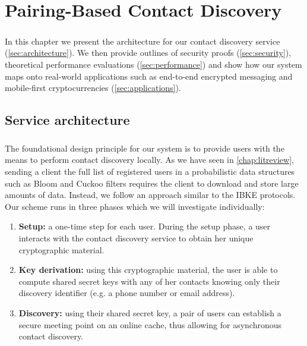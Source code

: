 \chapter{Pairing-Based Contact Discovery}
\label{chap:system}

\newcommand{\msk}{\mathbf{msk}}
\newcommand{\mpk}{\mathbf{mpk}}
\newcommand{\keyleft}[1]{k_{#1,\mathrm{LEFT}}}
\newcommand{\keyright}[1]{k_{#1,\mathrm{RIGHT}}}
\newcommand{\id}{\mathtt{id}}

\paragraph{} In this chapter we present the architecture for our contact discovery service (\autoref{sec:architecture}). We then provide outlines of security proofs (\autoref{sec:security}), theoretical performance evaluations (\autoref{sec:performance}) and show how our system maps onto real-world applications such as end-to-end encrypted messaging and mobile-first cryptocurrencies (\autoref{sec:applications}).

\section{Service architecture}
\label{sec:architecture}

\paragraph{} The foundational design principle for our system is to provide users with the means to perform contact discovery locally. As we have seen in \autoref{chap:litreview}, sending a client the full list of registered users in a probabilistic data structures such as Bloom and Cuckoo filters requires the client to download and store large amounts of data. Instead, we follow an approach similar to the IBKE protocols. Our scheme runs in three phases which we will investigate individually:
\begin{enumerate}
	\item \textbf{Setup:} a one-time step for each user. During the setup phase, a user interacts with the contact discovery service to obtain her unique cryptographic material.
	\item \textbf{Key derivation:} using this cryptographic material, the user is able to compute shared secret keys with any of her contacts knowing only their discovery identifier (e.g. a phone number or email address).
	\item \textbf{Discovery:} using their shared secret key, a pair of users can establish a secure meeting point on an online cache, thus allowing for asynchronous contact discovery.
\end{enumerate}


